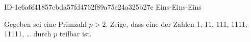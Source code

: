 \begin{exercise}
      {ID-1c6a6f41857cbda57fd4762f89a75e24a325b27c}
      {Eins-Eins-Eins}
  \ifproblem\problem\par
    Gegeben sei eine Primzahl $p>2$. Zeige, dass eine der Zahlen
    1, 11, 111, 1111, 11111, \ldots{} durch $p$ teilbar ist.
  \fi
\end{exercise}
